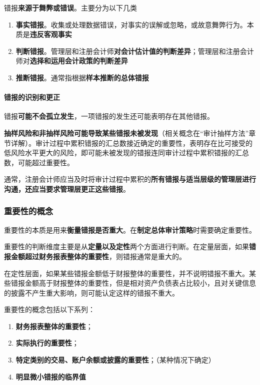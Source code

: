 \documentclass[UTF8,12pt]{ctexart}
\numberwithin{equation}{section} %
\numberwithin{figure}{section}
\numberwithin{table}{section}
\begin{document}
	错报\textbf{来源于舞弊或错误}。主要分为以下几类
	\begin{enumerate}
		\item \textbf{事实错报}。收集或处理数据错误，对事实的误解或忽略，或故意舞弊行为。本质是\textbf{违反客观事实}
		
		\item \textbf{判断错报}。管理层和注册会计师\textbf{对会计估计值的判断差异}；管理层和注册会计师对\textbf{选择和运用会计政策的判断差异}
		
		\item \textbf{推断错报}。通常指根据\textbf{样本推断的总体错报}
	\end{enumerate}
	
	\paragraph{错报的识别和更正}
	错报\textbf{可能不会孤立发生}，一项错报的发生还可能表明存在其他错报。
		
	\textbf{抽样风险和非抽样风险可能导致某些错报未被发现}（相关概念在“审计抽样方法”章节详解）。审计过程中累积错报的汇总数接近确定的重要性，表明存在比可接受的低风险水平更大的风险，即可能未被发现的错报连同审计过程中累积错报的汇总数，可能超过重要性。
		
	通常，注册会计师应当及时将审计过程中累积的\textbf{所有错报与适当层级的管理层进行沟通，还应当要求管理层更正这些错报}。
	
	
	\subsubsection{重要性的概念}
	重要性的本质是用来\textbf{衡量错报是否重大}。在\textbf{制定总体审计策略}时需要确定重要性。
	
	重要性的判断维度主要是从\textbf{定量以及定性}两个方面进行判断。在定量层面，如果\textbf{错报金额超过财务报表整体的重要性}，则错报通常是重大的。
	
	在定性层面，如果某些错报金额低于财报整体的重要性，并不说明错报不重大。某些错报金额高于财报整体的重要性，但是相对资产负债表占比较小，且对关键信息的披露不产生重大影响，则可能认定这样的错报不重大。
	
	
	重要性的概念包括以下系列：
	\begin{enumerate}
		\item \textbf{财务报表整体的重要性}；
		
		\item \textbf{实际执行的重要性}；
		
		\item \textbf{特定类别的交易、账户余额或披露的重要性}；（某种情况下确定）
		
		\item \textbf{明显微小错报的临界值}
	\end{enumerate}
\end{document}
